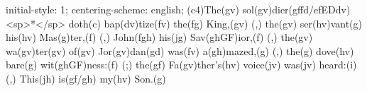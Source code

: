 initial-style: 1;
centering-scheme: english;
(c4)The(gv) sol(gv)dier(gffd/efEDdv) <sp>*</sp> doth(c) bap(dv)tize(fv) the(fg) King,(gv) (,) the(gv) ser(hv)vant(g) his(hv) Mas(g)ter,(f) (,) John(fgh) his(jg) Sav(ghGF)ior,(f) (,) the(gv) wa(gv)ter(gv) of(gv) Jor(gv)dan(gd) was(fv) a(gh)mazed,(g) (,) the(g) dove(hv) bare(g) wit(ghGF)ness:(f) (;) the(gf) Fa(gv)ther's(hv) voice(jv) was(jv) heard:(i) (,) This(jh) is(gf/gh) my(hv) Son.(g)